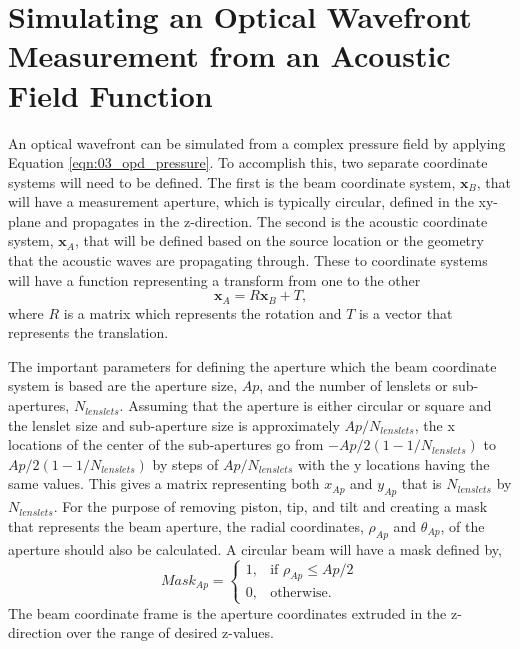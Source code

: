 

\section{Simulating an Optical Wavefront Measurement from an Acoustic Field Function}
\label{chap:03_simulated_beam}
An optical wavefront can be simulated from a complex pressure field by applying Equation \ref{eqn:03_opd_pressure}.
To accomplish this, two separate coordinate systems will need to be defined.
The first is the beam coordinate system, $\mathbf{x}_B $, that will have a measurement aperture, which is typically circular, defined in the xy-plane and propagates in the z-direction.
The second is the acoustic coordinate system, $\mathbf{x}_A$, that will be defined based on the source location or the geometry that the acoustic waves are propagating through.
These to coordinate systems will have a function representing a transform from one to the other
\begin{equation}
  \mathbf{x}_A = R\mathbf{x}_B+T \textrm{,}
  \label{eqn:03_coord_transform}
\end{equation}
where $R$ is a matrix which represents the rotation and $T$ is a vector that represents the translation.

The important parameters for defining the aperture which the beam coordinate system is based are the aperture size, $Ap$, and the number of lenslets or sub-apertures, $N_{lenslets}$.
Assuming that the aperture is either circular or square and the lenslet size and sub-aperture size is approximately $Ap/N_{lenslets}$, the x locations of the center of the sub-apertures go from $-Ap/2(1-1/N_{lenslets})$ to $Ap/2(1-1/N_{lenslets})$ by steps of $Ap/N_{lenslets}$ with the y locations having the same values.
This gives a matrix representing both $x_{Ap}$ and $y_{Ap}$ that is $N_{lenslets}$ by $N_{lenslets}$.
For the purpose of removing piston, tip, and tilt and creating a mask that represents the beam aperture, the radial coordinates, $\rho_{Ap}$ and $\theta_{Ap}$, of the aperture should also be calculated.
A circular beam will have a mask defined by,
\begin{equation}
  Mask_{Ap} =
  \begin{cases}
    1, & \text{if } \rho_{Ap}\leq Ap/2 \\
    0, & \text{otherwise.}
  \end{cases}
\end{equation}
The beam coordinate frame is the aperture coordinates extruded in the z-direction over the range of desired z-values.

